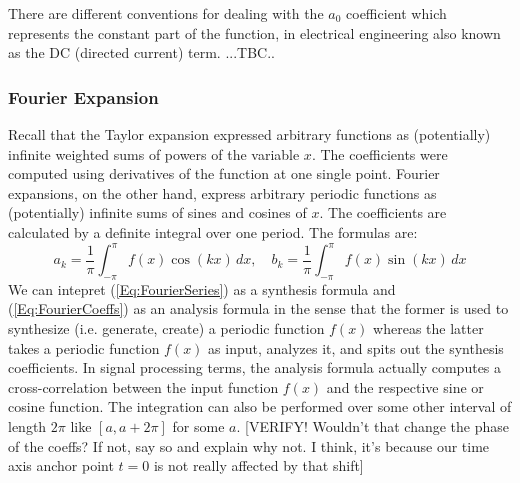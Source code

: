 \medskip
There are different conventions for dealing with the $a_0$ coefficient which represents the constant part of the function, in electrical engineering also known as the DC (directed current) term. ...TBC..




\subsubsection{Fourier Expansion}
Recall that the Taylor expansion expressed arbitrary functions as (potentially) infinite weighted sums of powers of the variable $x$. The coefficients were computed using derivatives of the function at one single point. Fourier expansions, on the other hand, express arbitrary periodic functions as (potentially) infinite sums of sines and cosines of $x$. The coefficients are calculated by a definite integral over one period. The formulas are:
\begin{equation}
\label{Eq:FourierCoeffs}	
 a_k = \frac{1}{\pi} \int_{-\pi}^{\pi} f(x) \cos(k x) \, dx, \quad
 b_k = \frac{1}{\pi} \int_{-\pi}^{\pi} f(x) \sin(k x) \, dx 
\end{equation}
We can intepret (\ref{Eq:FourierSeries}) as a synthesis formula and (\ref{Eq:FourierCoeffs}) as an analysis formula in the sense that the former is used to synthesize (i.e. generate, create) a periodic function $f(x)$ whereas the latter takes a periodic function $f(x)$ as input, analyzes it, and spits out the synthesis coefficients. In signal processing terms,  the analysis formula actually computes a cross-correlation between the input function $f(x)$ and the respective sine or cosine function. The integration can also be performed over some other interval of length $2\pi$ like $[a,a+2\pi]$ for some $a$. [VERIFY! Wouldn't that change the phase of the coeffs? If not, say so and explain why not. I think, it's because our time axis anchor point $t=0$ is not really affected by that shift] 

